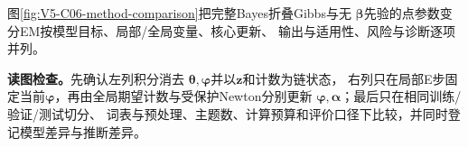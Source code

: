 \documentclass[UTF8,a4paper,11pt,openany]{ctexbook}
\begin{document}
\setcounter{page}{692}
\setcounter{chapter}{35}
\setcounter{section}{4}
\setcounter{figure}{7}
\pagestyle{headings}
图\ref{fig:V5-C06-method-comparison}把完整Bayes折叠Gibbs与无
$\boldsymbol\beta$先验的点参数变分EM按模型目标、局部/全局变量、核心更新、
输出与适用性、风险与诊断逐项并列。

\FloatBarrier
\noindent\textbf{读图检查。}先确认左列积分消去
$\boldsymbol\theta,\boldsymbol\varphi$并以$\boldsymbol z$和计数为链状态，
右列只在局部E步固定当前$\boldsymbol\varphi$，再由全局期望计数与受保护Newton分别更新
$\boldsymbol\varphi,\boldsymbol\alpha$；最后只在相同训练/验证/测试切分、
词表与预处理、主题数、计算预算和评价口径下比较，并同时登记模型差异与推断差异。
\end{document}

